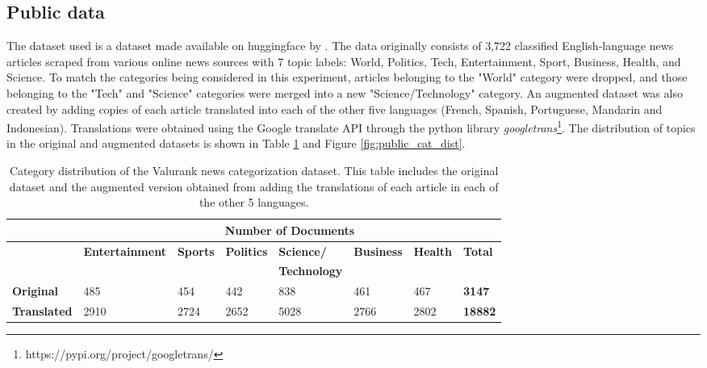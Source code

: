 \documentclass{l4proj}
\begin{document}
\subsection{Public data} \hfill \par
The dataset used is a dataset made available on huggingface by \cite{valurankdata}. The data originally consists of 3,722 classified English-language news articles scraped from various online news sources with 7 topic labels: World, Politics, Tech, Entertainment, Sport, Business, Health, and Science. To match the categories being considered in this experiment, articles belonging to the "World" category were dropped, and those belonging to the "Tech" and "Science" categories were merged into a new "Science/Technology" category. An augmented dataset was also created by adding copies of each article translated into each of the other five languages (French, Spanish, Portuguese, Mandarin and Indonesian). Translations were obtained using the Google translate API through the python library \emph{googletrans}\footnote{https://pypi.org/project/googletrans/}. The distribution of topics in the original and augmented datasets is shown in Table \ref{table:valurankstats} and Figure \ref{fig:public_cat_dist}.

\begin{table}[]
\begin{tabular}{llllllll}
\hline
\multicolumn{1}{c}{\textbf{}} & \multicolumn{7}{c}{\textbf{Number of Documents}}                                                                                          \\ \hline
                              & \textbf{Entertainment} & \textbf{Sports} & \textbf{Politics} & \textbf{Science/}   & \textbf{Business} & \textbf{Health} & \textbf{Total} \\
                              & \textbf{}              &                 &                   & \textbf{Technology} & \textbf{}         & \textbf{}       &                \\ \hline
\textbf{Original}             & 485                    & 454             & 442               & 838                 & 461               & 467             & \textbf{3147}  \\
\textbf{Translated}           & 2910                   & 2724            & 2652              & 5028                & 2766              & 2802            & \textbf{18882} \\ \hline
\end{tabular}
\caption{Category distribution of the Valurank news categorization dataset. This table includes the original dataset and the augmented version obtained from adding the translations of each article in each of the other 5 languages.}
\label{table:valurankstats}
\end{table}
\end{document}
